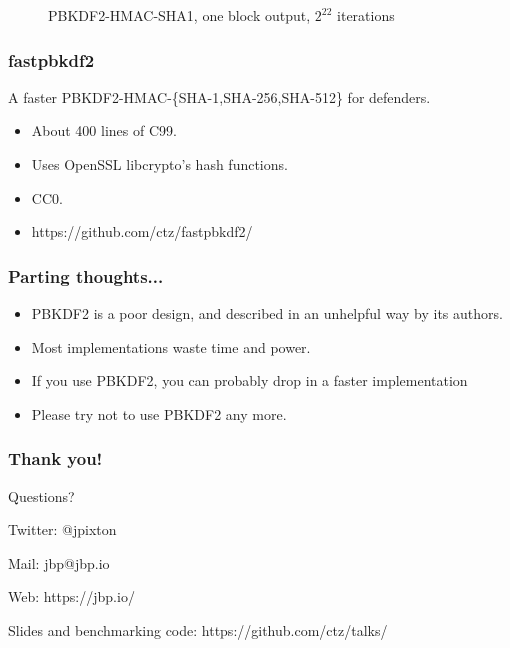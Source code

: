 \documentclass{beamer}
\begin{document}
{\begin{figure}
  
  \caption{PBKDF2-HMAC-SHA1, one block output, $2^{22}$ iterations}
  \end{figure}

}

\frame
{
  \frametitle{fastpbkdf2}

  A faster PBKDF2-HMAC-\{SHA-1,SHA-256,SHA-512\} for defenders.

  \begin{itemize}
    \item<1-> About 400 lines of C99.
    \item<2-> Uses OpenSSL libcrypto's hash functions.
    \item<3-> CC0.
    \item<4-> https://github.com/ctz/fastpbkdf2/
  \end{itemize}
}

\frame
{
  \frametitle{Parting thoughts...}

  \begin{itemize}
    \item<1-> PBKDF2 is a poor design, and described in an unhelpful way by its authors.
    \item<2-> Most implementations waste time and power.
    \item<3-> If you use PBKDF2, you can probably drop in a faster implementation
    \item<4-> Please try not to use PBKDF2 any more.
  \end{itemize}
}

\frame
{
  \frametitle{Thank you!}
  Questions?

  \vspace{5em}

  Twitter: @jpixton

  Mail: jbp@jbp.io

  Web: https://jbp.io/

  Slides and benchmarking code: https://github.com/ctz/talks/
}
\end{document}
